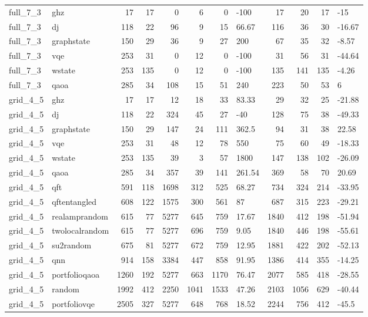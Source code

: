 \begin{longtable}{llrrrrrlrrrl}
full\_7\_3 & ghz & 17 & 17 & 0 & 6 & 0 & -100 & 17 & 20 & 17 & -15 \\
full\_7\_3 & dj & 118 & 22 & 96 & 9 & 15 & 66.67 & 116 & 36 & 30 & -16.67 \\
full\_7\_3 & graphstate & 150 & 29 & 36 & 9 & 27 & 200 & 67 & 35 & 32 & -8.57 \\
full\_7\_3 & vqe & 253 & 31 & 0 & 12 & 0 & -100 & 31 & 56 & 31 & -44.64 \\
full\_7\_3 & wstate & 253 & 135 & 0 & 12 & 0 & -100 & 135 & 141 & 135 & -4.26 \\
full\_7\_3 & qaoa & 285 & 34 & 108 & 15 & 51 & 240 & 223 & 50 & 53 & 6 \\
grid\_4\_5 & ghz & 17 & 17 & 12 & 18 & 33 & 83.33 & 29 & 32 & 25 & -21.88 \\
grid\_4\_5 & dj & 118 & 22 & 324 & 45 & 27 & -40 & 128 & 75 & 38 & -49.33 \\
grid\_4\_5 & graphstate & 150 & 29 & 147 & 24 & 111 & 362.5 & 94 & 31 & 38 & 22.58 \\
grid\_4\_5 & vqe & 253 & 31 & 48 & 12 & 78 & 550 & 75 & 60 & 49 & -18.33 \\
grid\_4\_5 & wstate & 253 & 135 & 39 & 3 & 57 & 1800 & 147 & 138 & 102 & -26.09 \\
grid\_4\_5 & qaoa & 285 & 34 & 357 & 39 & 141 & 261.54 & 369 & 58 & 70 & 20.69 \\
grid\_4\_5 & qft & 591 & 118 & 1698 & 312 & 525 & 68.27 & 734 & 324 & 214 & -33.95 \\
grid\_4\_5 & qftentangled & 608 & 122 & 1575 & 300 & 561 & 87 & 687 & 315 & 223 & -29.21 \\
grid\_4\_5 & realamprandom & 615 & 77 & 5277 & 645 & 759 & 17.67 & 1840 & 412 & 198 & -51.94 \\
grid\_4\_5 & twolocalrandom & 615 & 77 & 5277 & 696 & 759 & 9.05 & 1840 & 446 & 198 & -55.61 \\
grid\_4\_5 & su2random & 675 & 81 & 5277 & 672 & 759 & 12.95 & 1881 & 422 & 202 & -52.13 \\
grid\_4\_5 & qnn & 914 & 158 & 3384 & 447 & 858 & 91.95 & 1386 & 414 & 355 & -14.25 \\
grid\_4\_5 & portfolioqaoa & 1260 & 192 & 5277 & 663 & 1170 & 76.47 & 2077 & 585 & 418 & -28.55 \\
grid\_4\_5 & random & 1992 & 412 & 2250 & 1041 & 1533 & 47.26 & 2103 & 1056 & 629 & -40.44 \\
grid\_4\_5 & portfoliovqe & 2505 & 327 & 5277 & 648 & 768 & 18.52 & 2244 & 756 & 412 & -45.5 \\

\end{longtable}
